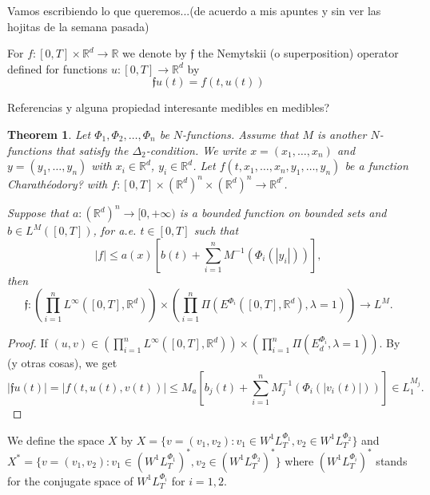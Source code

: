 \documentclass[twoside]{article}
\newtheorem{thm}{Theorem}[section]
\theoremstyle{remark}
\newcommand{\lmj}{L^{M}}
\newcommand{\rr}{\mathbb{R}}
\renewcommand{\leq}{\leqslant}
\begin{document}
Vamos escribiendo lo que queremos...(de acuerdo a mis apuntes y sin ver las hojitas de la semana pasada)

For $f:[0,T]\times \rr^d\to\rr$  we denote by $\mathfrak{f}$ the Nemytskii (o superposition) operator defined for functions $u:[0,T]\to\rr^d$ by 
\[\mathfrak{f}u(t)=f(t,u(t))\]

Referencias y alguna propiedad interesante medibles en medibles? \cite{krasnosel2011integral,KR}


\begin{thm}
Let $\Phi_1,\Phi_2,\dots,\Phi_n$ be $N$-functions. 
Assume that $M$ is another $N$-functions that satisfy the $\Delta_2$-condition. 
We write $x=(x_1,\dots,x_n)$  and $y=(y_1,\dots,y_n)$ with $x_i\in \rr^d$, $y_i\in \rr^d$.
Let $f(t,x_1,\ldots,x_n,y_1,\ldots,y_n)$ be a function Charath\'eodory? with $f:[0,T]\times {(\rr^d)}^n\times {(\rr^d)}^n \to \rr^{d'}$.

Suppose that $a:(\rr^d)^n\to [0,+\infty)$ is a bounded function on bounded sets and 
$b \in L^{M}([0,T])$, for a.e. $t \in [0, T]$ such that 
\begin{equation}\label{eq:condicion estru gral}
|f|\leq a(x)[ b(t)+\sum_{i=1}^{n} M^{-1}(\Phi_i(|y_i|))],
\end{equation}
then 
\[
\mathfrak{f}:\left(\prod\limits_{i=1}^n L^{\infty}([0,T],\rr^d)\right) \times \left(\prod\limits_{i=1}^n \Pi(E^{\Phi_i}([0,T],\rr^d),\lambda=1)\right)
\to \lmj.\]
\end{thm}

\begin{proof}
If $(u,v)\in \left(\prod\limits_{i=1}^n L^{\infty}([0,T],\rr^d)\right) \times \left(\prod\limits_{i=1}^n \Pi(E_d^{\Phi_i},\lambda=1)\right)$.
By \cite[ Thm. 17.6]{KR} (y otras cosas), we get 
 \[|\mathfrak{f}u(t)|=|f(t,u(t),v(t))| \leq 
M_a [b_j(t) +\sum_{i=1}^{n} M_j^{-1}(\Phi_i(|v_i(t)|))]
\in
 L_1^{M_j}.\]
\end{proof}

We define the space $X$ by
$X=\{v=(v_1,v_2):v_1 \in W^{1}L^{\Phi_1}_T,v_2\in W^{1}L^{\Phi_2}_T\}$
and 
$X^*=\{v=(v_1,v_2):v_1 \in (W^{1}L^{\Phi_1}_T)^*,v_2\in (W^{1}L^{\Phi_2}_T)^*\}$
where $(W^{1}L^{\Phi_i}_T)^*$ stands for the conjugate space of $W^{1}L^{\Phi_i}_T$ for $i=1,2$.
\end{document}
